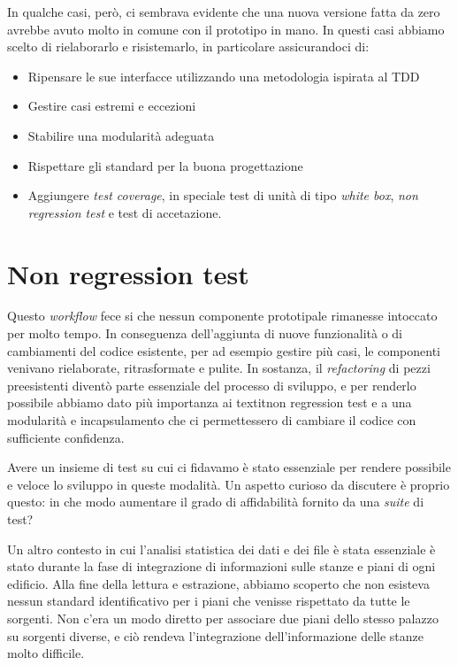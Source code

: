 \documentclass[12pt]{report}
\begin{document}
In qualche casi, però, ci sembrava evidente che una nuova versione fatta da zero avrebbe avuto molto in comune con il prototipo in mano. In questi casi abbiamo scelto di rielaborarlo e risistemarlo, in particolare assicurandoci di:

\begin{itemize}
	\item Ripensare le sue interfacce utilizzando una metodologia ispirata al TDD
	\item Gestire casi estremi e eccezioni
	\item Stabilire una modularità adeguata
	\item Rispettare gli standard per la buona progettazione
	\item Aggiungere \textit{test coverage}, in speciale test di unità di tipo \textit{white box}, \textit{non regression test} e test di accetazione.
\end{itemize}

\section{Non regression test}

Questo \textit{workflow} fece si che nessun componente prototipale rimanesse intoccato per molto tempo. In conseguenza dell'aggiunta di nuove funzionalità o di cambiamenti del codice esistente, per ad esempio gestire più casi, le componenti venivano rielaborate, ritrasformate e pulite. In sostanza, il \textit{refactoring} di pezzi preesistenti diventò parte essenziale del processo di sviluppo, e per renderlo possibile abbiamo dato più importanza ai textit{non regression test} e a una modularità e incapsulamento che ci permettessero di cambiare il codice con sufficiente confidenza. 

Avere un insieme di test su cui ci fidavamo è stato essenziale per rendere possibile e veloce lo sviluppo in queste modalità. Un aspetto curioso da discutere è proprio questo: in che modo aumentare il grado di affidabilità fornito da una \textit{suite} di test?




Un altro contesto in cui l'analisi statistica dei dati e dei file è stata essenziale è stato durante la fase di integrazione di informazioni sulle stanze e piani di ogni edificio. Alla fine della lettura e estrazione, abbiamo scoperto che non esisteva nessun standard identificativo per i piani che venisse rispettato da tutte le sorgenti. Non c'era un modo diretto per associare due piani dello stesso palazzo su sorgenti diverse, e ciò rendeva l'integrazione dell'informazione delle stanze molto difficile.
\end{document}
